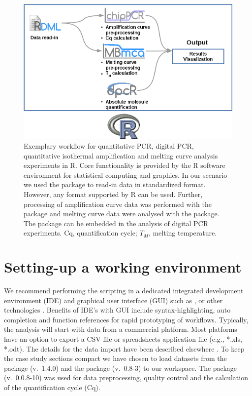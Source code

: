 \begin{figure}[htbp]
  \centering
  \includegraphics[clip=true,trim=0cm 0cm 0cm 0cm]{figures/workflow.png}
  \caption{Exemplary workflow for quantitative PCR, digital PCR, quantitative 
isothermal amplification and melting curve analysis experiments in R. Core 
functionality is provided by the R software environment for statistical 
computing and graphics. In our scenario we used the  package to 
read-in data in standardized format. However, any format supported by R can be 
used. Further, processing of amplification curve data was performed with the 
 package and melting curve data were analysed with the 
 package. The  package can be embedded in the 
analysis of digital PCR experiments. Cq, quantification cycle; $T_{M}$, melting 
temperature. 
} 
\label{figure:workflow}
\end{figure}

\section{Setting-up a working environment}

We recommend performing the scripting in a dedicated integrated development 
environment (IDE) and graphical user interface (GUI) such as  
\citep{rodiger_rkward_2012},  \citep{RStudio, gandrud_2013} or 
other technologies \citep{Valero_2012}. Benefits of IDE's with GUI include 
syntax-highlighting, auto completion and function references for rapid 
prototyping of workflows. Typically, the analysis will start with data from a 
commercial platform. Most platforms have an option to export a CSV file or 
spreadsheets application file (e.g., *.xls, *.odt). The details for the data 
import have been described elsewhere \citep{RDCT2010c, rodiger_rkward_2012}. To 
keep the case study sections compact we have chosen to load datasets from the 
 package \citep{ritz_2008} (v.~1.4.0) and the  
package (v.~0.8-3) to our workspace. The  package 
\citep{roediger_2015_Bioinformatics} (v.~0.0.8-10) was used for data 
preprocessing, quality control and  the calculation of the quantification cycle 
(Cq).

